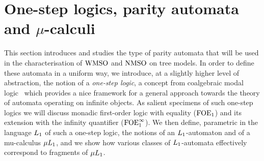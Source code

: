 \section{One-step logics, parity automata and $\mu$-calculi}
   \label{sec:parityaut}

This section introduces and studies the type of parity automata that will be
used in the characterisation of $\mathrm{WMSO}$ and $\mathrm{NMSO}$ on tree models. 
In order to define these automata in a uniform way, we introduce, at a slightly
higher level of abstraction, the notion of a \emph{one-step logic}, a concept 
from coalgebraic modal logic~\cite{cirs:modu04} which provides a nice framework 
for a general approach towards the theory of automata operating on infinite
objects.
As salient specimens of such one-step logics we will discuss monadic 
first-order logic with equality ($\mathrm{FOE}_1$) and its extension with the infinity 
quantifier ($\mathrm{FOE}^{\infty}_1$).
We then define, parametric in the language $L_{1}$ of such a one-step logic, 
the notions of an $L_{1}$-automaton and of a mu-calculus $\mu L_{1}$, 
and we show how various classes of $L_{1}$-automata effectively correspond 
to fragments of $\mu L_{1}$.








% 